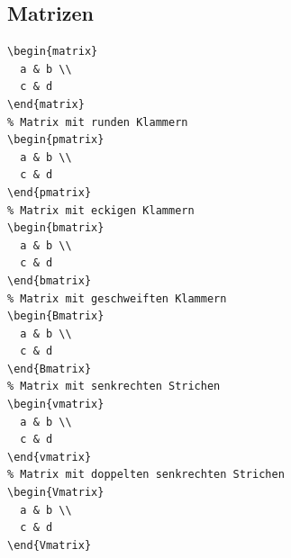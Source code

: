 \documentclass[12pt,a4paper]{article}
\begin{document}
\subsection{Matrizen}

\begin{lstlisting}[style=latex]
% Matrix ohne Klammern
\begin{matrix}
  a & b \\
  c & d
\end{matrix}
% Matrix mit runden Klammern
\begin{pmatrix}
  a & b \\
  c & d
\end{pmatrix}
% Matrix mit eckigen Klammern
\begin{bmatrix}
  a & b \\
  c & d
\end{bmatrix}
% Matrix mit geschweiften Klammern
\begin{Bmatrix}
  a & b \\
  c & d
\end{Bmatrix}
% Matrix mit senkrechten Strichen
\begin{vmatrix}
  a & b \\
  c & d
\end{vmatrix}
% Matrix mit doppelten senkrechten Strichen
\begin{Vmatrix}
  a & b \\
  c & d
\end{Vmatrix}
\end{lstlisting}
\end{document}
